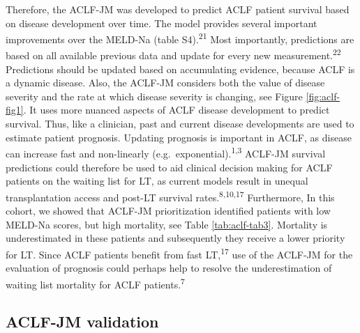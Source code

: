 \documentclass[11pt,english,]{book} %
\begin{document}
Therefore, the ACLF-JM was developed to predict ACLF patient survival based on disease development over time. The model provides several important improvements over the MELD-Na (table S4).\textsuperscript{21} Most importantly, predictions are based on all available previous data and update for every new measurement.\textsuperscript{22} Predictions should be updated based on accumulating evidence, because ACLF is a dynamic disease. Also, the ACLF-JM considers both the value of disease severity and the rate at which disease severity is changing, see Figure \ref{fig:aclf-fig1}. It uses more nuanced aspects of ACLF disease development to predict survival. Thus, like a clinician, past and current disease developments are used to estimate patient prognosis. Updating prognosis is important in ACLF, as disease can increase fast and non-linearly (e.g.~exponential).\textsuperscript{1,3} ACLF-JM survival predictions could therefore be used to aid clinical decision making for ACLF patients on the waiting list for LT, as current models result in unequal transplantation access and post-LT survival rates.\textsuperscript{8,10,17} Furthermore, In this cohort, we showed that ACLF-JM prioritization identified patients with low MELD-Na scores, but high mortality, see Table \ref{tab:aclf-tab3}. Mortality is underestimated in these patients and subsequently they receive a lower priority for LT. Since ACLF patients benefit from fast LT,\textsuperscript{17} use of the ACLF-JM for the evaluation of prognosis could perhaps help to resolve the underestimation of waiting list mortality for ACLF patients.\textsuperscript{7}

\hypertarget{aclf-jm-validation}{%
\subsection*{ACLF-JM validation}\label{aclf-jm-validation}}
\end{document}
